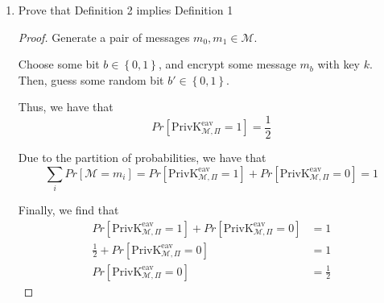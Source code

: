 \documentclass{article}
\begin{document}
\begin{enumerate}
\begin{enumerate}
        \begin{proof}
          We have some perfectly secret encryption scheme over some message 
          space $\mathcal{M}$, and we generate a pair of messages 
          $m_0, m_1 \in \mathcal{M}$.

          Due to $\mathcal{M}$ being perfectly secret, we have that
          \[
            Pr[\mathcal{M} = m_0] = Pr[\mathcal{M} = m_1]
          \]

          Due to the partition of probabilities rule, we also find that
          $\sum\limits_{i} Pr[m_i] = 1$, i.e.
          \[
            Pr[\mathcal{M} = m_0] + Pr[\mathcal{M} = m_1] = 1
          \]

          Thus, we have
          \begin{align*}
            Pr[\mathcal{M} = m_0] + Pr[\mathcal{M} = m_1] &= 1\\
            Pr[\mathcal{M} = m_1] + Pr[\mathcal{M} = m_1] &= 1\\
            2Pr[\mathcal{M} = m_1] &= 1\\
            Pr[\mathcal{M} = m_1] &= \frac{1}{2}\\
          \end{align*}
        \end{proof}

      \item Prove that Definition 2 implies Definition 1
        
        \begin{proof}
          Generate a pair of messages $m_0, m_1 \in \mathcal{M}$.

          Choose some bit $b \in \left\{0, 1\right\}$, and encrypt some message
          $m_b$ with key $k$. Then, guess some random bit 
          $b' \in \left\{0, 1\right\}$.

          Thus, we have that
          \[
            Pr[\text{PrivK}_{\mathcal{M}, \Pi}^{\text{eav}} = 1] = \frac{1}{2}
          \]

          Due to the partition of probabilities, we have that
          \[
            \sum\limits_i Pr[\mathcal{M} = m_i] =  
            Pr[\text{PrivK}_{\mathcal{M}, \Pi}^{\text{eav}} = 1] + 
            Pr[\text{PrivK}_{\mathcal{M}, \Pi}^{\text{eav}} = 0] = 1
          \]

          Finally, we find that
          \begin{align*}
            Pr[\text{PrivK}_{\mathcal{M}, \Pi}^{\text{eav}} = 1] + 
            Pr[\text{PrivK}_{\mathcal{M}, \Pi}^{\text{eav}} = 0] &= 1\\
            \frac{1}{2} + Pr[\text{PrivK}_{\mathcal{M}, \Pi}^{\text{eav}} = 0] &= 1\\
            Pr[\text{PrivK}_{\mathcal{M}, \Pi}^{\text{eav}} = 0] &= \frac{1}{2}
          \end{align*}


\end{proof}
\end{enumerate}
\end{enumerate}
\end{document}
